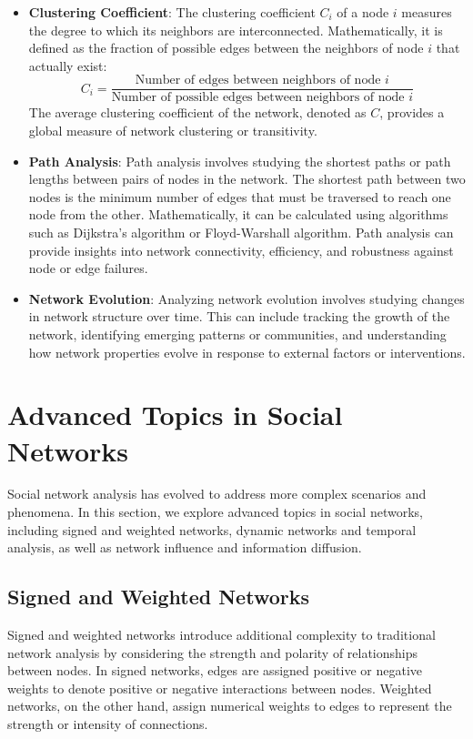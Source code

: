 \documentclass[12pt]{book} %
\begin{document}
\begin{itemize}
    \item \textbf{Clustering Coefficient}: The clustering coefficient \(C_i\) of a node \(i\) measures the degree to which its neighbors are interconnected. Mathematically, it is defined as the fraction of possible edges between the neighbors of node \(i\) that actually exist:
    \[ C_i = \frac{{\text{{Number of edges between neighbors of node }} i}}{{\text{{Number of possible edges between neighbors of node }} i}} \]
    The average clustering coefficient of the network, denoted as \(C\), provides a global measure of network clustering or transitivity.
    
    \item \textbf{Path Analysis}: Path analysis involves studying the shortest paths or path lengths between pairs of nodes in the network. The shortest path between two nodes is the minimum number of edges that must be traversed to reach one node from the other. Mathematically, it can be calculated using algorithms such as Dijkstra's algorithm or Floyd-Warshall algorithm. Path analysis can provide insights into network connectivity, efficiency, and robustness against node or edge failures.
    
    \item \textbf{Network Evolution}: Analyzing network evolution involves studying changes in network structure over time. This can include tracking the growth of the network, identifying emerging patterns or communities, and understanding how network properties evolve in response to external factors or interventions.
\end{itemize}

\section{Advanced Topics in Social Networks}

Social network analysis has evolved to address more complex scenarios and phenomena. In this section, we explore advanced topics in social networks, including signed and weighted networks, dynamic networks and temporal analysis, as well as network influence and information diffusion.

\subsection{Signed and Weighted Networks}

Signed and weighted networks introduce additional complexity to traditional network analysis by considering the strength and polarity of relationships between nodes. In signed networks, edges are assigned positive or negative weights to denote positive or negative interactions between nodes. Weighted networks, on the other hand, assign numerical weights to edges to represent the strength or intensity of connections.
\end{document}
